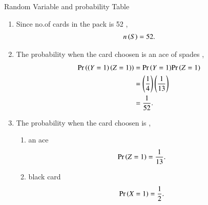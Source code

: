 \documentclass[journal,12pt,onecolumn]{IEEEtran}
\begin{document}
\begin{table}[htpb]
\centering 
\caption{Random Variable and probability Table}
\label{tab:r.v_probability}

\end{table}
 \begin{enumerate}[label=(\alph*)] 
                 \item Since no.of cards in the pack is 52 ,
                         \begin{align}
				 n\left(S\right) = 52 .
                         \end{align} 
                 \item The probability when the card choosen is an ace of spades ,
                         \begin{align} 
				 \Pr\left(\left(Y=1\right)\left(Z=1\right)\right) &= {\Pr\left(Y=1\right)}{\Pr\left(Z=1\right)} \\
				         &= \left(\frac{1}{4}\right)\left(\frac{1}{13}\right) \\
					 &= \frac{1}{52} . 
                         \end{align} 
                 \item The probability when the card choosen is , 
 \begin{enumerate}[label=(\alph*)]
		 \item an ace
			 \begin{align}
			         \Pr\left(Z = 1\right) &= \frac{1}{13}.
	                 \end{align}			 
		 \item black card
			 \begin{align}
			         \Pr\left(X = 1\right) &= \frac{1}{2}.
	                 \end{align}			 
				 
 \end{enumerate}
 \end{enumerate} 
 
\end{document}
